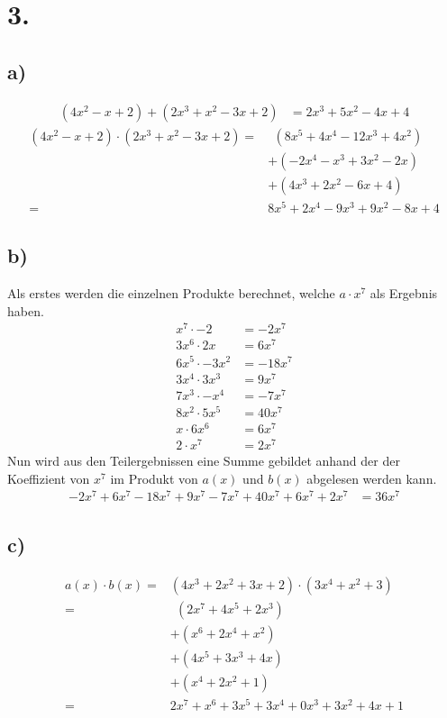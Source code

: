 \documentclass[a4paper]{scrartcl}
\begin{document}
\section{3.}
	\subsection{a)}
		\begin{align}
			(4x^2-x+2)+(2x^3+x^2-3x+2) &=2x^3+5x^2-4x+4
		\end{align}
		\begin{align}
			(4x^2-x+2)\cdot(2x^3+x^2-3x+2) =&\ \ (8x^5+4x^4-12x^3+4x^2)\\
				& +(-2x^4-x^3+3x^2-2x) \\
				& +(4x^3+2x^2-6x+4) \\
				=& 8x^5+2x^4-9x^3+9x^2-8x+4
		\end{align}
		
	\subsection{b)}
		Als erstes werden die einzelnen Produkte berechnet, welche \(a\cdot x^7\) als Ergebnis 
		haben.
		\begin{align}
			x^7\cdot -2 &= -2x^7 \\
			3x^6\cdot 2x &= 6x^7 \\
			6x^5\cdot -3x^2 &= -18x^7 \\
			3x^4\cdot 3x^3 &= 9x^7 \\
			7x^3 \cdot -x^4 &= -7x^7 \\
			8x^2 \cdot 5x^5 &= 40x^7 \\
			x\cdot 6x^6 &= 6x^7 \\
			2\cdot x^7 &= 2x^7
		\end{align}
		Nun wird aus den Teilergebnissen eine Summe gebildet anhand der der Koeffizient von \(x^7\) 
		im Produkt von \(a(x)\) und \(b(x)\) abgelesen werden kann.
		\begin{align}
			-2x^7+6x^7-18x^7+9x^7-7x^7+40x^7+6x^7+2x^7 &= 36x^7
		\end{align}
		
	\subsection{c)}
		\begin{align}
			a(x)\cdot b(x)=& (4x^3+2x^2+3x+2)\cdot (3x^4+x^2+3) \\
			=&\ \ (2x^7+4x^5+2x^3) \\
			&+(x^6+2x^4+x^2) \\
			&+(4x^5+3x^3+4x) \\
			&+(x^4+2x^2+1) \\
			=& 2x^7+x^6+3x^5+3x^4+0x^3+3x^2+4x+1
		\end{align}
	
\end{document}
